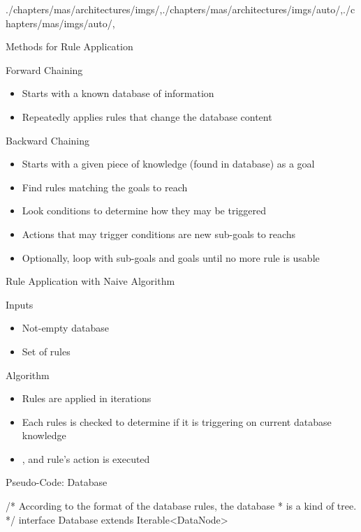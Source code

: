 \begin{graphicspathcontext}{{./chapters/mas/architectures/imgs/},{./chapters/mas/architectures/imgs/auto/},{./chapters/mas/imgs/auto/},\old}
\begin{frame}{Methods for Rule Application}
	\begin{block}{Forward Chaining}
		\begin{itemize}
		\item Starts with a known database of information
		\item Repeatedly applies rules that change the database content
		\end{itemize}
	\end{block}
	\begin{block}{Backward Chaining}
		\begin{itemize}
			\item Starts with a given piece of knowledge (found in database) as a goal
			\item Find rules matching the goals to reach
			\item Look conditions to determine how they may be triggered
			\item Actions that may trigger conditions are new sub-goals to reachs
			\item Optionally, loop with sub-goals and goals until no more rule is usable
		\end{itemize}
	\end{block}
\end{frame}

\begin{frame}{Rule Application with Naive Algorithm}
	\begin{block}{Inputs}
		\begin{itemize}
			\item Not-empty database
			\item Set of rules
		\end{itemize}
	\end{block}
	\begin{block}{Algorithm}
		\begin{itemize}
			\item Rules are applied in iterations
			\item Each rules is checked to determine if it is triggering on current database knowledge
			\item {}, and rule's action is executed
		\end{itemize}
	\end{block}
\end{frame}

\begin{frame}[fragile]{{Pseudo-Code:} Database}
\begin{sarllisting}[basicstyle=\scriptsize]
/* According to the format of the database rules, the database
 * is a kind of tree.
 */
interface Database extends Iterable<DataNode> {

}
\end{sarllisting}
\end{frame}
\end{graphicspathcontext}
